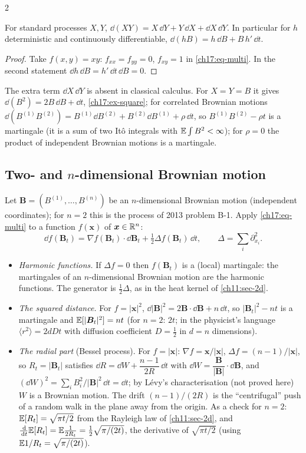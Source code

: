 \begin{paracol}{2}
\begin{corollary}\label{ch17:cor-product}
For standard processes $X,Y$, $\dd(XY)=X\,\dd Y+Y\,\dd X+\dd X\,\dd Y$. In particular for $h$ deterministic and continuously differentiable, $\dd(hB)=h\,\dd B+B\,h'\,\dd t$.
\end{corollary}
\begin{proof}
Take $f(x,y)=xy$: $f_{xx}=f_{yy}=0$, $f_{xy}=1$ in \eqref{ch17:eq-multi}. In the second statement $\dd h\,\dd B=h'\,\dd t\,\dd B=0$.
\end{proof}
The extra term $\dd X\,\dd Y$ is absent in classical calculus. For $X=Y=B$ it gives $\dd(B^2)=2B\,\dd B+\dd t$, \cref{ch17:ex-square}; for correlated Brownian motions $\dd(B^{(1)}B^{(2)})=B^{(1)}\dd B^{(2)}+B^{(2)}\dd B^{(1)}+\rho\,\dd t$, so $B^{(1)}B^{(2)}-\rho t$
is a martingale (it is a sum of two It\^o integrals with $\mathbb{E}\int B^2<\infty$); for $\rho=0$ the product of independent Brownian motions is a martingale.

\subsection{Two- and $n$-dimensional Brownian motion}
Let $\bm B=(B^{(1)},\dots,B^{(n)})$ be an $n$-dimensional Brownian motion (independent coordinates); for $n=2$ this is the process of 2013 problem B-1. Apply \eqref{ch17:eq-multi} to a function $f(\bm x)$ of $\bm x\in\mathbb{R}^n$:
\begin{equation}\label{ch17:eq-nD}
  \dd f(\bm B_t)=\nabla f(\bm B_t)\cdot\dd\bm B_t+\tfrac12\Delta f(\bm B_t)\,\dd t ,\qquad\Delta=\sum_i\partial_{x_i}^2 .
\end{equation}
\begin{itemize}
  \item \emph{Harmonic functions.} If $\Delta f=0$ then $f(\bm B_t)$ is a (local) martingale: the martingales of an $n$-dimensional Brownian motion are the harmonic functions. The generator is $\tfrac12\Delta$, as in the heat kernel of \cref{ch11:sec-2d}.
  \item \emph{The squared distance.} For $f=|\bm x|^2$, $\dd|\bm B|^2=2\bm B\cdot\dd\bm B+n\,\dd t$, so $|\bm B_t|^2-nt$ is a martingale and $\mathbb{E}[|\bm B_t|^2]=nt$ (for $n=2$: $2t$; in the physicist's language $\langle r^2\rangle=2dDt$ with diffusion coefficient $D=\tfrac12$ in $d=n$ dimensions).
  \item \emph{The radial part} (Bessel process). For $f=|\bm x|$: $\nabla f=\bm x/|\bm x|$, $\Delta f=(n-1)/|\bm x|$, so $R_t=|\bm B_t|$ satisfies $\dd R=\dd W+\dfrac{n-1}{2R}\,\dd t$ with $\dd W=\dfrac{\bm B}{|\bm B|}\cdot\dd\bm B$,
        and $(\dd W)^2=\sum_iB_i^2/|\bm B|^2\,\dd t=\dd t$; by L\'evy's characterisation (not proved here) $W$ is a Brownian motion. The drift $(n-1)/(2R)$ is the ``centrifugal'' push of a random walk in the plane away from the origin. As a check for $n=2$: $\mathbb{E}[R_t]=\sqrt{\pi t/2}$ from the Rayleigh law of \cref{ch11:sec-2d}, and $\tfrac{\,\mathrm{d}}{\,\mathrm{d} t}\mathbb{E}[R_t]=\mathbb{E}\tfrac1{2R_t}=\tfrac12\sqrt{\pi/(2t)}$, the derivative of $\sqrt{\pi t/2}$ (using $\mathbb{E} 1/R_t=\sqrt{\pi/(2t)}$).
\end{itemize}


\end{paracol}
